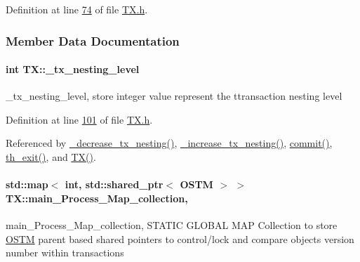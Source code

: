 Definition at line \hyperlink{_t_x_8h_source_l00074}{74} of file \hyperlink{_t_x_8h_source}{T\+X.\+h}.



\subsubsection{Member Data Documentation}
\paragraph[{\texorpdfstring{\+\_\+tx\+\_\+nesting\+\_\+level}{_tx_nesting_level}}]{\setlength{\rightskip}{0pt plus 5cm}int T\+X\+::\+\_\+tx\+\_\+nesting\+\_\+level\hspace{0.3cm}{\ttfamily [private]}}\hypertarget{class_t_x_ae8f413fd7f4fea322e7ad3c668f9898e_ae8f413fd7f4fea322e7ad3c668f9898e}{}\label{class_t_x_ae8f413fd7f4fea322e7ad3c668f9898e_ae8f413fd7f4fea322e7ad3c668f9898e}
\+\_\+tx\+\_\+nesting\+\_\+level, store integer value represent the ttransaction nesting level 

Definition at line \hyperlink{_t_x_8h_source_l00101}{101} of file \hyperlink{_t_x_8h_source}{T\+X.\+h}.



Referenced by \hyperlink{_t_x_8cpp_source_l00279}{\+\_\+decrease\+\_\+tx\+\_\+nesting()}, \hyperlink{_t_x_8cpp_source_l00272}{\+\_\+increase\+\_\+tx\+\_\+nesting()}, \hyperlink{_t_x_8cpp_source_l00177}{commit()}, \hyperlink{_t_x_8cpp_source_l00052}{th\+\_\+exit()}, and \hyperlink{_t_x_8cpp_source_l00036}{T\+X()}.

\paragraph[{\texorpdfstring{main\+\_\+\+Process\+\_\+\+Map\+\_\+collection}{main_Process_Map_collection}}]{\setlength{\rightskip}{0pt plus 5cm}std\+::map$<$ int, std\+::shared\+\_\+ptr$<$ {\bf O\+S\+TM} $>$ $>$ T\+X\+::main\+\_\+\+Process\+\_\+\+Map\+\_\+collection\hspace{0.3cm}{\ttfamily [static]}, {\ttfamily [private]}}\hypertarget{class_t_x_a1a45d726894190695314464d7cd97c29_a1a45d726894190695314464d7cd97c29}{}\label{class_t_x_a1a45d726894190695314464d7cd97c29_a1a45d726894190695314464d7cd97c29}
main\+\_\+\+Process\+\_\+\+Map\+\_\+collection, S\+T\+A\+T\+IC G\+L\+O\+B\+AL M\+AP Collection to store \hyperlink{class_o_s_t_m}{O\+S\+TM} parent based shared pointers to control/lock and compare objects version number within transactions 

